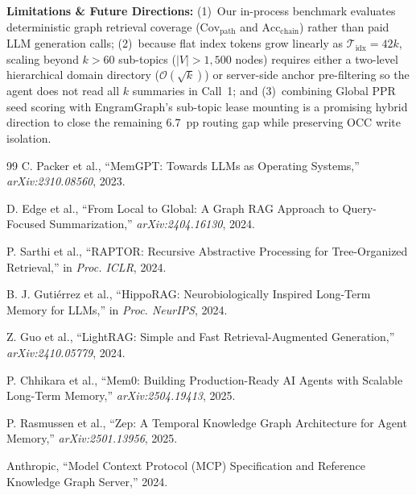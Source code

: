 \documentclass[10pt]{article}
\begin{document}
\textbf{Limitations \& Future Directions:} (1)~Our in-process benchmark evaluates deterministic graph retrieval coverage ($\mathrm{Cov}_{\mathrm{path}}$ and $\mathrm{Acc}_{\mathrm{chain}}$) rather than paid LLM generation calls; (2)~because flat index tokens grow linearly as $\mathcal{T}_{\mathrm{idx}} = 42k$, scaling beyond $k > 60$ sub-topics ($|V| > 1,500$ nodes) requires either a two-level hierarchical domain directory ($\mathcal{O}(\sqrt{k})$) or server-side anchor pre-filtering so the agent does not read all $k$ summaries in Call~1; and (3)~combining Global PPR seed scoring with EngramGraph's sub-topic lease mounting is a promising hybrid direction to close the remaining $6.7$~pp routing gap while preserving OCC write isolation.

\begin{thebibliography}{99}
\small
{}
C. Packer et al., ``MemGPT: Towards LLMs as Operating Systems,'' \emph{arXiv:2310.08560}, 2023.

D. Edge et al., ``From Local to Global: A Graph RAG Approach to Query-Focused Summarization,'' \emph{arXiv:2404.16130}, 2024.

P. Sarthi et al., ``RAPTOR: Recursive Abstractive Processing for Tree-Organized Retrieval,'' in \emph{Proc. ICLR}, 2024.

B. J. Guti{\'e}rrez et al., ``HippoRAG: Neurobiologically Inspired Long-Term Memory for LLMs,'' in \emph{Proc. NeurIPS}, 2024.

Z. Guo et al., ``LightRAG: Simple and Fast Retrieval-Augmented Generation,'' \emph{arXiv:2410.05779}, 2024.

P. Chhikara et al., ``Mem0: Building Production-Ready AI Agents with Scalable Long-Term Memory,'' \emph{arXiv:2504.19413}, 2025.

P. Rasmussen et al., ``Zep: A Temporal Knowledge Graph Architecture for Agent Memory,'' \emph{arXiv:2501.13956}, 2025.

Anthropic, ``Model Context Protocol (MCP) Specification and Reference Knowledge Graph Server,'' 2024.
\end{thebibliography}
\end{document}
